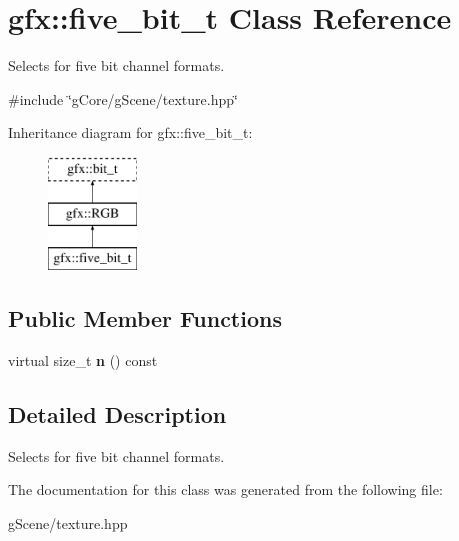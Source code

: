 \hypertarget{classgfx_1_1five__bit__t}{\section{gfx\-:\-:five\-\_\-bit\-\_\-t Class Reference}
\label{classgfx_1_1five__bit__t}
}


Selects for five bit channel formats.  




{\ttfamily \#include \char`\"{}g\-Core/g\-Scene/texture.\-hpp\char`\"{}}

Inheritance diagram for gfx\-:\-:five\-\_\-bit\-\_\-t\-:\begin{figure}[H]
\begin{center}
\leavevmode
\includegraphics[height=3.000000cm]{classgfx_1_1five__bit__t}
\end{center}
\end{figure}
\subsection*{Public Member Functions}
\begin{DoxyCompactItemize}
\item 
\hypertarget{classgfx_1_1five__bit__t_a1a679bbd79e36d9f539f7dd566289880}{virtual size\-\_\-t {\bfseries n} () const }\label{classgfx_1_1five__bit__t_a1a679bbd79e36d9f539f7dd566289880}

\end{DoxyCompactItemize}


\subsection{Detailed Description}
Selects for five bit channel formats. 

The documentation for this class was generated from the following file\-:\begin{DoxyCompactItemize}
\item 
g\-Scene/texture.\-hpp\end{DoxyCompactItemize}
